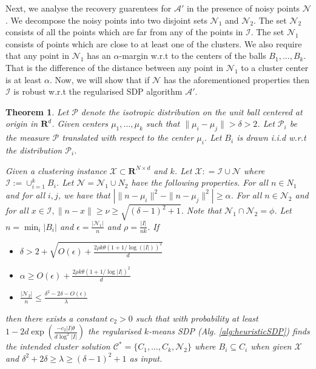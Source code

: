 \documentclass[12pt]{article}
\newcommand{\mc}{\mathcal}
\newcommand{\mb}{\mathbf}
\newtheorem{theorem}{Theorem}
\begin{document}
Next, we analyse the recovery guarentees for $\mc A'$ in the presence of noisy points $\mc N$. We decompose the noisy points into two disjoint sets $\mc N_1$ and $\mc N_2$. The set $\mc N_2$ consists of all the points which are far from any of the points in $\mc I$. The set $\mc N_1$ consists of points which are close to at least one of the clusters. We also require that any point in $\mc N_1$ has an $\alpha$-margin w.r.t to the centers of the balls $B_1, \ldots, B_k$. That is the difference of the distance between any point in $\mc N_1$ to a cluster center is at least $\alpha$. Now, we will show that if $\mc N$ has the aforementioned properties then $\mc I$ is robust w.r.t the regularised SDP algorithm $\mc A'$.

\begin{theorem}
\label{thm:regularizedSDPGeneral}
Let $\mc P$ denote the isotropic distribution on the unit ball centered at origin in $\mb R^d$. Given centers $\mu_1, \ldots, \mu_k$ such that $\|\mu_i - \mu_j\| > \delta > 2$. Let $\mc P_i$ be the measure $\mc P$ translated with respect to the center $\mu_i$. Let $B_i$ is drawn i.i.d w.r.t the distribution $\mc P_i$. 

Given a clustering instance $\mc X \subset \mb R^{N \times d}$ and $k$. Let $\mc X : = \mc I \cup \mc N$ where $\mc I := \cup_{i=1}^k B_i$. Let $\mc N = \mc N_1 \cup N_2$ have the following properties. For all $n \in N_1$ and for all $i, j$, we have that $| \|n-\mu_i\|^2 - \|n-\mu_j\|^2| \ge \alpha$. For all $n \in \mc N_2$ and for all $x \in \mc I, \|n- x\| \ge \nu \ge \sqrt{(\delta-1)^2+1}$. Note that $\mc N_1 \cap \mc N_2 = \phi$. Let $n = \min_i |B_i|$ and $\epsilon = \frac{|\mc N_1|}{n}$ and $\rho = \frac{|I|}{nk}$. If  

\begin{itemize}
  \item $\delta > 2 + \sqrt{ O(\epsilon) + \frac{2\rho k\theta(1+1/\log(|I|))^2}{d}}$ 
  \item $\alpha \ge O(\epsilon)+ \frac{2\rho k\theta(1+1/\log|I|)^2}{d}$ 
  \item $\frac{|\mc N_2|}{n} \le \frac{\delta^2-2\delta-O(\epsilon)}{\lambda}$
\end{itemize}
then there exists a constant $c_2 > 0$ such that with probability at least $1 - 2d\exp(\frac{-c_2|I|\theta}{d\log^2|I|})$ the regularised $k$-means SDP (Alg. \ref{alg:heuristicSDP}) finds the intended cluster solution  $\mc C^* = \{C_1, \ldots, C_k, \mc N_2\}$ where $B_i \subseteq C_i$ when given $\mc X$ and $\delta^2+2\delta \ge \lambda \ge (\delta-1)^2 + 1$ as input.
\end{theorem}
\end{document}
